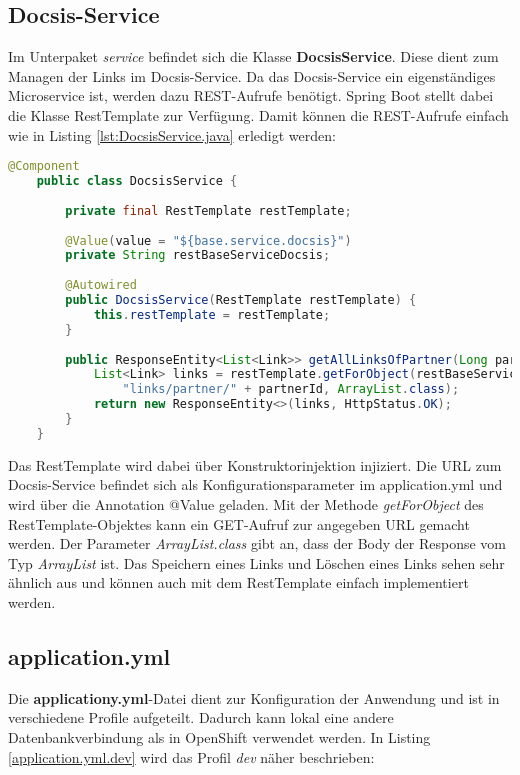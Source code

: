 \subsection{Docsis-Service}
Im Unterpaket \textit{service} befindet sich die Klasse \textbf{DocsisService}. Diese dient zum Managen der Links im Docsis-Service. Da das Docsis-Service ein eigenständiges Microservice ist, werden dazu REST-Aufrufe benötigt. Spring Boot stellt dabei die Klasse RestTemplate zur Verfügung. Damit können die REST-Aufrufe einfach wie in Listing \ref{lst:DocsisService.java} erledigt werden:

\begin{lstlisting}[language=java, caption={DocsisService.java}, label={lst:DocsisService.java}]
	@Component
	public class DocsisService {
	
		private final RestTemplate restTemplate;
		
		@Value(value = "${base.service.docsis}")
		private String restBaseServiceDocsis;
		
		@Autowired
		public DocsisService(RestTemplate restTemplate) {
			this.restTemplate = restTemplate;
		}
		
		public ResponseEntity<List<Link>> getAllLinksOfPartner(Long partnerId) {
			List<Link> links = restTemplate.getForObject(restBaseServiceDocsis +
				"links/partner/" + partnerId, ArrayList.class);
			return new ResponseEntity<>(links, HttpStatus.OK);
		}
	}
\end{lstlisting}

Das RestTemplate wird dabei über Konstruktorinjektion injiziert. Die URL zum Docsis-Service befindet sich als Konfigurationsparameter im application.yml und wird über die Annotation @Value geladen.
Mit der Methode \textit{getForObject} des RestTemplate-Objektes kann ein GET-Aufruf zur angegeben URL gemacht werden. Der Parameter \textit{ArrayList.class} gibt an, dass der Body der Response vom Typ \textit{ArrayList} ist.
Das Speichern eines Links und Löschen eines Links sehen sehr ähnlich aus und können auch mit dem RestTemplate einfach implementiert werden.


\subsection{application.yml}
Die \textbf{applicationy.yml}-Datei dient zur Konfiguration der Anwendung und ist in verschiedene Profile aufgeteilt. Dadurch kann lokal eine andere Datenbankverbindung als in OpenShift verwendet werden. In Listing \ref{application.yml.dev} wird das Profil \textit{dev} näher beschrieben:

